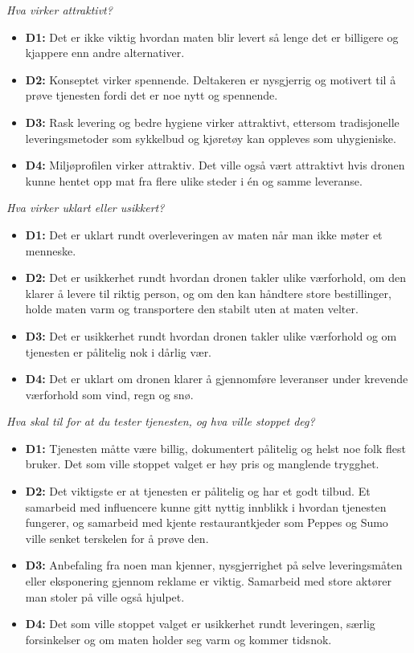 \textit{Hva virker attraktivt?}
\begin{itemize}[leftmargin=1.5em, nosep]
  \item \textbf{D1:} Det er ikke viktig hvordan maten blir levert så lenge
  det er billigere og kjappere enn andre alternativer.
  \item \textbf{D2:} Konseptet virker spennende. Deltakeren er
  nysgjerrig og motivert til å prøve tjenesten fordi det er noe nytt og
  spennende.
  \item \textbf{D3:} Rask levering og bedre hygiene virker attraktivt,
  ettersom tradisjonelle leveringsmetoder som sykkelbud og
  kjøretøy kan oppleves som uhygieniske.
  \item \textbf{D4:} Miljøprofilen virker attraktiv. Det ville også vært
  attraktivt hvis dronen kunne hentet opp mat fra flere ulike steder i én og
  samme leveranse.
\end{itemize}

\textit{Hva virker uklart eller usikkert?}
\begin{itemize}[leftmargin=1.5em, nosep]
  \item \textbf{D1:} Det er uklart rundt overleveringen av maten når man
  ikke møter et menneske.
  \item \textbf{D2:} Det er usikkerhet rundt hvordan dronen takler ulike
  værforhold, om den klarer å levere til riktig person, og om den kan
  håndtere store bestillinger, holde maten varm og transportere den stabilt
  uten at maten velter.
  \item \textbf{D3:} Det er usikkerhet rundt hvordan dronen takler ulike
  værforhold og om tjenesten er pålitelig nok i dårlig vær.
  \item \textbf{D4:} Det er uklart om dronen klarer å gjennomføre
  leveranser under krevende værforhold som vind, regn og snø.
\end{itemize}

\textit{Hva skal til for at du tester tjenesten, og hva ville stoppet deg?}
\begin{itemize}[leftmargin=1.5em, nosep]
  \item \textbf{D1:} Tjenesten måtte være billig, dokumentert pålitelig og
  helst noe folk flest bruker. Det som ville stoppet valget er høy pris
  og manglende trygghet.
  \item \textbf{D2:} Det viktigste er at tjenesten er pålitelig og har et
  godt tilbud. Et samarbeid med influencere kunne gitt nyttig innblikk i
  hvordan tjenesten fungerer, og samarbeid med kjente restaurantkjeder som
  Peppes og Sumo ville senket terskelen for å prøve den.
  \item \textbf{D3:} Anbefaling fra noen man kjenner, nysgjerrighet på selve
  leveringsmåten eller eksponering gjennom reklame er viktig. Samarbeid med
  store aktører man stoler på ville også hjulpet.
  \item \textbf{D4:} Det som ville stoppet valget er usikkerhet rundt
  leveringen, særlig forsinkelser og om maten holder seg varm og kommer
  tidsnok.
\end{itemize}

